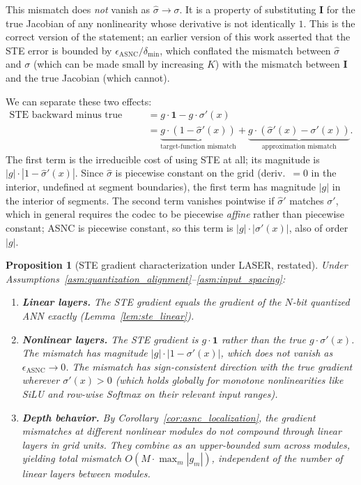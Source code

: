 \documentclass{article}
\theoremstyle{plain}
\newtheorem{proposition}[theorem]{Proposition}
\theoremstyle{definition}
\theoremstyle{remark}
\begin{document}
This mismatch does \emph{not} vanish as $\hat\sigma \to \sigma$. It is a
property of substituting $\mathbf{I}$ for the true Jacobian of any
nonlinearity whose derivative is not identically $1$. This is the correct
version of the statement; an earlier version of this work asserted that the
STE error is bounded by $\epsilon_{\mathrm{ASNC}}/\delta_{\min}$, which
conflated the mismatch between $\hat\sigma$ and $\sigma$ (which can be made
small by increasing $K$) with the mismatch between $\mathbf{I}$ and the true
Jacobian (which cannot).

We can separate these two effects:
\begin{align*}
\text{STE backward minus true backward}
&= g\cdot\mathbf{1} - g\cdot\sigma'(x) \\
&= \underbrace{g\cdot(1-\hat\sigma'(x))}_{\text{target-function mismatch}}
 + \underbrace{g\cdot(\hat\sigma'(x) - \sigma'(x))}_{\text{approximation mismatch}}.
\end{align*}
The first term is the irreducible cost of using STE at all; its magnitude is
$|g|\cdot|1 - \hat\sigma'(x)|$. Since $\hat\sigma$ is piecewise constant on
the grid (deriv.\ $= 0$ in the interior, undefined at segment boundaries),
the first term has magnitude $|g|$ in the interior of segments.
The second term vanishes pointwise if $\hat\sigma'$ matches $\sigma'$, which
in general requires the codec to be piecewise \emph{affine} rather than
piecewise constant; ASNC is piecewise constant, so this term is
$|g|\cdot|\sigma'(x)|$, also of order $|g|$.

\begin{proposition}[STE gradient characterization under LASER, restated]
\label{prop:ste_correct}
Under Assumptions~\ref{asm:quantization_alignment}--\ref{asm:input_spacing}:
\begin{enumerate}
\item \textbf{Linear layers.} The STE gradient equals the gradient of the
$N$-bit quantized ANN exactly (Lemma~\ref{lem:ste_linear}).
\item \textbf{Nonlinear layers.} The STE gradient is
$g\cdot\mathbf{1}$ rather than the true $g\cdot\sigma'(x)$. The mismatch has
magnitude $|g|\cdot|1-\sigma'(x)|$, which does not vanish as
$\epsilon_{\mathrm{ASNC}}\to 0$. The mismatch has sign-consistent direction
with the true gradient wherever $\sigma'(x) > 0$ (which holds globally for
monotone nonlinearities like SiLU and row-wise Softmax on their relevant
input ranges).
\item \textbf{Depth behavior.} By Corollary~\ref{cor:asnc_localization}, the
gradient mismatches at different nonlinear modules do not compound through
linear layers in grid units. They combine as an upper-bounded sum across
modules, yielding total mismatch $O(M \cdot \max_m|g_m|)$, independent of the
number of linear layers between modules.
\end{enumerate}
\end{proposition}
\end{document}
